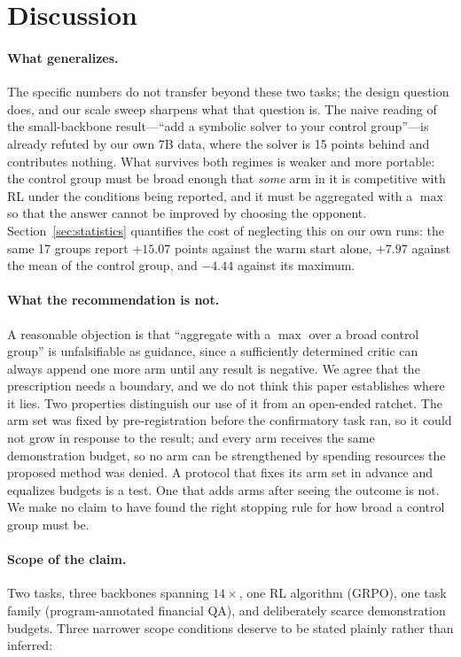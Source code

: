 \section{Discussion}
\label{sec:discussion}

\paragraph{What generalizes.}
The specific numbers do not transfer beyond these two tasks; the design question
does, and our scale sweep sharpens what that question is. The naive reading of
the small-backbone result---``add a symbolic solver to your control group''---is
already refuted by our own 7B data, where the solver is 15 points behind and
contributes nothing. What survives both regimes is weaker and more portable: the
control group must be broad enough that \emph{some} arm in it is competitive
with RL under the conditions being reported, and it must be aggregated with a
$\max$ so that the answer cannot be improved by choosing the opponent.
Section~\ref{sec:statistics} quantifies the cost of neglecting this on our own
runs: the same 17 groups report $+15.07$ points against the warm start alone,
$+7.97$ against the mean of the control group, and $-4.44$ against its maximum.

\paragraph{What the recommendation is not.}
A reasonable objection is that ``aggregate with a $\max$ over a broad control
group'' is unfalsifiable as guidance, since a sufficiently determined critic can
always append one more arm until any result is negative. We agree that the
prescription needs a boundary, and we do not think this paper establishes where
it lies. Two properties distinguish our use of it from an open-ended ratchet.
The arm set was fixed by pre-registration before the confirmatory task ran, so
it could not grow in response to the result; and every arm receives the same
demonstration budget, so no arm can be strengthened by spending resources the
proposed method was denied. A protocol that fixes its arm set in advance and
equalizes budgets is a test. One that adds arms after seeing the outcome is not.
We make no claim to have found the right stopping rule for how broad a control
group must be.

\paragraph{Scope of the claim.}
Two tasks, three backbones spanning $14\times$, one RL algorithm (GRPO), one
task family (program-annotated financial QA), and deliberately scarce
demonstration budgets. Three narrower scope conditions deserve to be stated
plainly rather than inferred:

